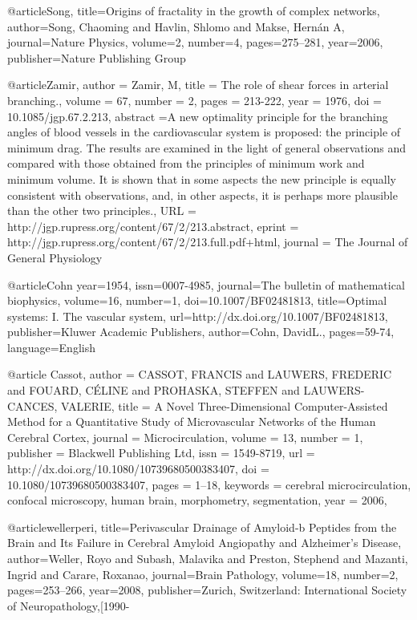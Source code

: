 @article{Song,
  title={Origins of fractality in the growth of complex networks},
  author={Song, Chaoming and Havlin, Shlomo and Makse, Hern{\'a}n A},
  journal={Nature Physics},
  volume={2},
  number={4},
  pages={275--281},
  year={2006},
  publisher={Nature Publishing Group}
}

@article{Zamir,
author = {Zamir, M}, 
title = {The role of shear forces in arterial branching.},
volume = {67}, 
number = {2}, 
pages = {213-222}, 
year = {1976}, 
doi = {10.1085/jgp.67.2.213}, 
abstract ={A new optimality principle for the branching angles of blood vessels in the cardiovascular system is proposed: the principle of minimum drag. The results are examined in the light of general observations and compared with those obtained from the principles of minimum work and minimum volume. It is shown that in some aspects the new principle is equally consistent with observations, and, in other aspects, it is perhaps more plausible than the other two principles.}, 
URL = {http://jgp.rupress.org/content/67/2/213.abstract}, 
eprint = {http://jgp.rupress.org/content/67/2/213.full.pdf+html}, 
journal = {The Journal of General Physiology} 
}

@article{Cohn
year={1954},
issn={0007-4985},
journal={The bulletin of mathematical biophysics},
volume={16},
number={1},
doi={10.1007/BF02481813},
title={Optimal systems: I. The vascular system},
url={http://dx.doi.org/10.1007/BF02481813},
publisher={Kluwer Academic Publishers},
author={Cohn, DavidL.},
pages={59-74},
language={English}
}

@article {Cassot,
author = {CASSOT, FRANCIS and LAUWERS, FREDERIC and FOUARD, CÉLINE and PROHASKA, STEFFEN and LAUWERS-CANCES, VALERIE},
title = {A Novel Three-Dimensional Computer-Assisted Method for a Quantitative Study of Microvascular Networks of the Human Cerebral Cortex},
journal = {Microcirculation},
volume = {13},
number = {1},
publisher = {Blackwell Publishing Ltd},
issn = {1549-8719},
url = {http://dx.doi.org/10.1080/10739680500383407},
doi = {10.1080/10739680500383407},
pages = {1--18},
keywords = {cerebral microcirculation, confocal microscopy, human brain, morphometry, segmentation},
year = {2006},
}

@article{wellerperi,
  title={Perivascular Drainage of Amyloid-b Peptides from the Brain and Its Failure in Cerebral Amyloid Angiopathy and Alzheimer's Disease},
  author={Weller, Royo and Subash, Malavika and Preston, Stephend and Mazanti, Ingrid and Carare, Roxanao},
  journal={Brain Pathology},
  volume={18},
  number={2},
  pages={253--266},
  year={2008},
  publisher={Zurich, Switzerland: International Society of Neuropathology,[1990-}
}

